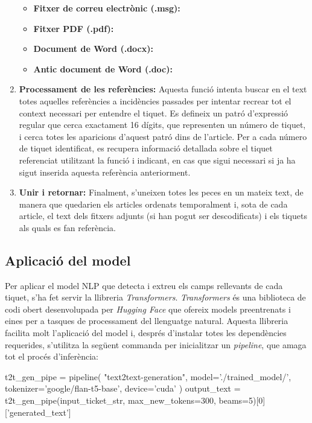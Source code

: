 \begin{enumerate}
\begin{itemize}
               \item \textbf{Fitxer de correu electrònic (.msg):}
               \item \textbf{Fitxer PDF (.pdf):}
               \item \textbf{Document de Word (.docx):}
               \item \textbf{Antic document de Word (.doc):}
          \end{itemize}
     \item \textbf{Processament de les referències:} Aquesta funció intenta buscar en el text totes aquelles referències a incidències passades per intentar recrear tot el context necessari per entendre el tiquet. Es defineix un patró d'expressió regular que cerca exactament 16 dígits, que representen un número de tiquet, i cerca totes les aparicions d'aquest patró dins de l'article. Per a cada número de tiquet identificat, es recupera informació detallada sobre el tiquet referenciat utilitzant la funció  i indicant, en cas que sigui necessari si ja ha sigut inserida aquesta referència anteriorment.
     \item \textbf{Unir i retornar:} Finalment, s'uneixen totes les peces en un mateix text, de manera que quedarien els articles ordenats temporalment i, sota de cada article, el text dels fitxers adjunts (si han pogut ser descodificats) i els tiquets als quals es fan referència.
\end{enumerate}


\subsection{Aplicació del model}
Per aplicar el model NLP que detecta i extreu els camps rellevants de cada tiquet, s'ha fet servir la llibreria \textit{Transformers}.
\textit{Transformers} és una biblioteca de codi obert desenvolupada per \textit{Hugging Face} \cite{Hugging-Face} que ofereix models preentrenats i eines per a tasques de processament del llenguatge natural. Aquesta llibreria facilita molt l'aplicació del model i, després d'instalar totes les dependències requerides, s'utilitza la següent commanda per inicialitzar un \textit{pipeline}, que amaga tot el procés d'inferència:

\begin{python}
t2t_gen_pipe = pipeline(
     "text2text-generation",
     model='./trained_model/',
     tokenizer='google/flan-t5-base',
     device='cuda'
     )     
output_text = t2t_gen_pipe(input_ticket_str, max_new_tokens=300, beams=5)[0]['generated_text']
\end{python}


